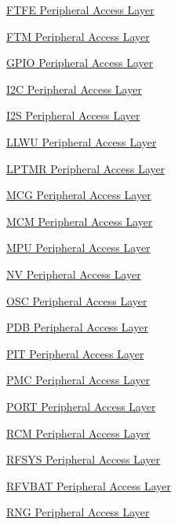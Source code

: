 \begin{DoxyCompactItemize}
\hyperlink{group__FTFE__Peripheral__Access__Layer}{F\+T\+F\+E Peripheral Access Layer}
\item 
\hyperlink{group__FTM__Peripheral__Access__Layer}{F\+T\+M Peripheral Access Layer}
\item 
\hyperlink{group__GPIO__Peripheral__Access__Layer}{G\+P\+I\+O Peripheral Access Layer}
\item 
\hyperlink{group__I2C__Peripheral__Access__Layer}{I2\+C Peripheral Access Layer}
\item 
\hyperlink{group__I2S__Peripheral__Access__Layer}{I2\+S Peripheral Access Layer}
\item 
\hyperlink{group__LLWU__Peripheral__Access__Layer}{L\+L\+W\+U Peripheral Access Layer}
\item 
\hyperlink{group__LPTMR__Peripheral__Access__Layer}{L\+P\+T\+M\+R Peripheral Access Layer}
\item 
\hyperlink{group__MCG__Peripheral__Access__Layer}{M\+C\+G Peripheral Access Layer}
\item 
\hyperlink{group__MCM__Peripheral__Access__Layer}{M\+C\+M Peripheral Access Layer}
\item 
\hyperlink{group__MPU__Peripheral__Access__Layer}{M\+P\+U Peripheral Access Layer}
\item 
\hyperlink{group__NV__Peripheral__Access__Layer}{N\+V Peripheral Access Layer}
\item 
\hyperlink{group__OSC__Peripheral__Access__Layer}{O\+S\+C Peripheral Access Layer}
\item 
\hyperlink{group__PDB__Peripheral__Access__Layer}{P\+D\+B Peripheral Access Layer}
\item 
\hyperlink{group__PIT__Peripheral__Access__Layer}{P\+I\+T Peripheral Access Layer}
\item 
\hyperlink{group__PMC__Peripheral__Access__Layer}{P\+M\+C Peripheral Access Layer}
\item 
\hyperlink{group__PORT__Peripheral__Access__Layer}{P\+O\+R\+T Peripheral Access Layer}
\item 
\hyperlink{group__RCM__Peripheral__Access__Layer}{R\+C\+M Peripheral Access Layer}
\item 
\hyperlink{group__RFSYS__Peripheral__Access__Layer}{R\+F\+S\+Y\+S Peripheral Access Layer}
\item 
\hyperlink{group__RFVBAT__Peripheral__Access__Layer}{R\+F\+V\+B\+A\+T Peripheral Access Layer}
\item 
\hyperlink{group__RNG__Peripheral__Access__Layer}{R\+N\+G Peripheral Access Layer}
\item 

\end{DoxyCompactItemize}
